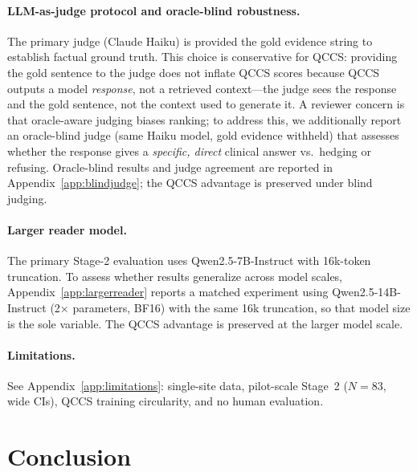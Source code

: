 \documentclass{article}
\begin{document}
\paragraph{LLM-as-judge protocol and oracle-blind robustness.}
The primary judge (Claude Haiku) is provided the gold evidence string to establish
factual ground truth. This choice is conservative for QCCS: providing the gold
sentence to the judge does not inflate QCCS scores because QCCS outputs a model
\emph{response}, not a retrieved context---the judge sees the response and the
gold sentence, not the context used to generate it. A reviewer concern is that
oracle-aware judging biases ranking; to address this, we additionally report an
oracle-blind judge (same Haiku model, gold evidence withheld) that assesses whether
the response gives a \emph{specific, direct} clinical answer vs.\ hedging or refusing.
Oracle-blind results and judge agreement are reported in Appendix~\ref{app:blindjudge};
the QCCS advantage is preserved under blind judging.

\paragraph{Larger reader model.}
The primary Stage-2 evaluation uses Qwen2.5-7B-Instruct with 16k-token truncation.
To assess whether results generalize across model scales,
Appendix~\ref{app:largerreader} reports a matched experiment using
Qwen2.5-14B-Instruct (2$\times$ parameters, BF16) with the same 16k truncation,
so that model size is the sole variable.
The QCCS advantage is preserved at the larger model scale.

\paragraph{Limitations.}
See Appendix~\ref{app:limitations}: single-site data, pilot-scale Stage~2
($N{=}83$, wide CIs), QCCS training circularity, and no human evaluation.

\section{Conclusion}
\label{sec:conclusion}
\end{document}
